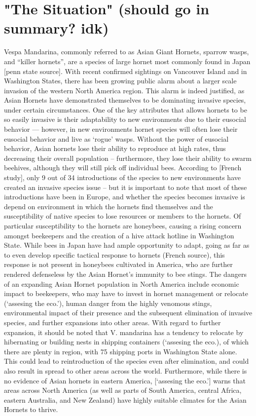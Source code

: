 \documentclass{article}
\begin{document}
\section{"The Situation" (should go in summary? idk)}
Vespa Mandarina, commonly referred to as Asian Giant Hornets, sparrow wasps, and “killer hornets”, are a species of large hornet most commonly found in Japan [penn state source]. With recent confirmed sightings on Vancouver Island and in Washington States, there has been growing public alarm about a larger scale invasion of the western North America region. This alarm is indeed justified, as Asian Hornets have demonstrated themselves to be dominating invasive species, under certain circumstances. One of the key attributes that allows hornets to be so easily invasive is their adaptability to new environments due to their eusocial behavior –– however, in new environments hornet species will often lose their eusocial behavior and live as ‘rogue’ wasps. Without the power of eusocial behavior, Asian hornets lose their ability to reproduce at high rates, thus decreasing their overall population – furthermore, they lose their ability to swarm beehives, although they will still pick off individual bees. According to [French study], only 9 out of 34 introductions of the species to new environments have created an invasive species issue – but it is important to note that most of these introductions have been in Europe, and whether the species becomes invasive is depend on environment in which the hornets find themselves and the susceptibility of native species to lose resources or members to the hornets. Of particular susceptibility to the hornets are honeybees, causing a rising concern amongst beekeepers and the creation of a hive attack hotline in Washington State. While bees in Japan have had ample opportunity to adapt, going as far as to even develop specific tactical response to hornets (French source), this response is not present in honeybees cultivated in America, who are further rendered defenseless by the Asian Hornet’s immunity to bee stings. 
The dangers of an expanding Asian Hornet population in North America include economic impact to beekeepers, who may have to invest in hornet management or relocate (‘assesing the eco.’), human danger from the highly venomous stings, environmental impact of their presence and the subsequent elimination of invasive species, and further expansions into other areas. With regard to further expansion, it should be noted that V. mandarina has a tendency to relocate by hibernating or building nests in shipping containers (‘assesing the eco.), of which there are plenty in region, with 75 shipping ports in Washington State alone. This could lead to reintroduction of the species even after elimination, and could also result in spread to other areas across the world. Furthermore, while there is no evidence of Asian hornets in eastern America, [‘assesing the eco.’] warns that areas across North America (as well as parts of South America, central Africa, eastern Australia, and New Zealand) have highly suitable climates for the Asian Hornets to thrive. 
\end{document}
